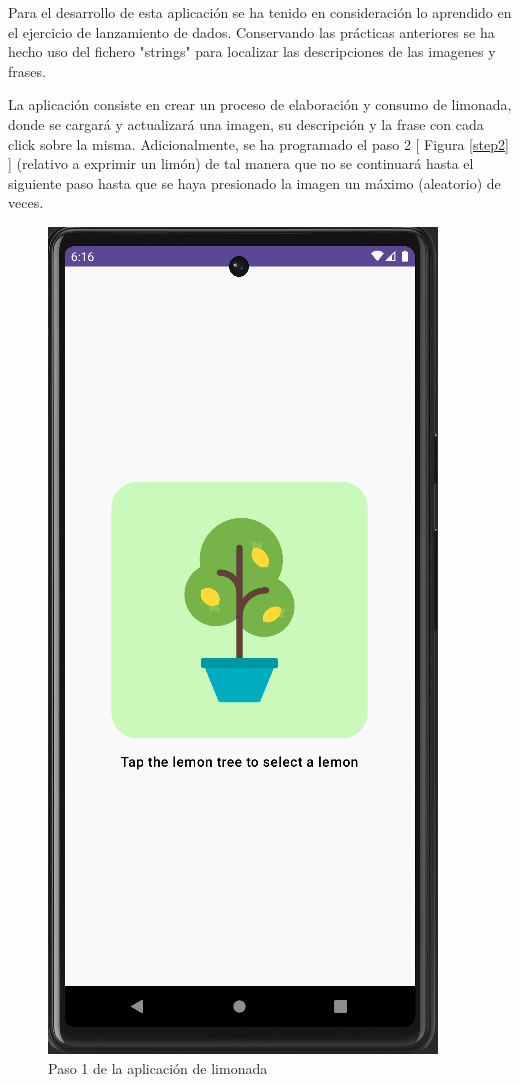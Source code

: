 \documentclass{article}
\begin{document}
    Para el desarrollo de esta aplicación se ha tenido en consideración lo aprendido en el
     ejercicio de lanzamiento de dados. Conservando las prácticas anteriores se ha hecho uso
     del fichero "strings" para localizar las descripciones de las imagenes y frases.

    La aplicación consiste en crear un proceso de elaboración y consumo de limonada, donde
     se cargará y actualizará una imagen, su descripción y la frase con cada click sobre la misma. Adicionalmente, se 
     ha programado el paso 2 [ Figura \ref{step2} ] (relativo a exprimir un limón) de tal manera que no se continuará
     hasta el siguiente paso hasta que se haya presionado la imagen un máximo (aleatorio) de veces.

     \begin{figure}[H]
        \centerline{\includegraphics[scale=0.2]{step1.png}}
        \caption{Paso 1 de la aplicación de limonada}
        \label{fig:step1}
    \end{figure}
\end{document}
